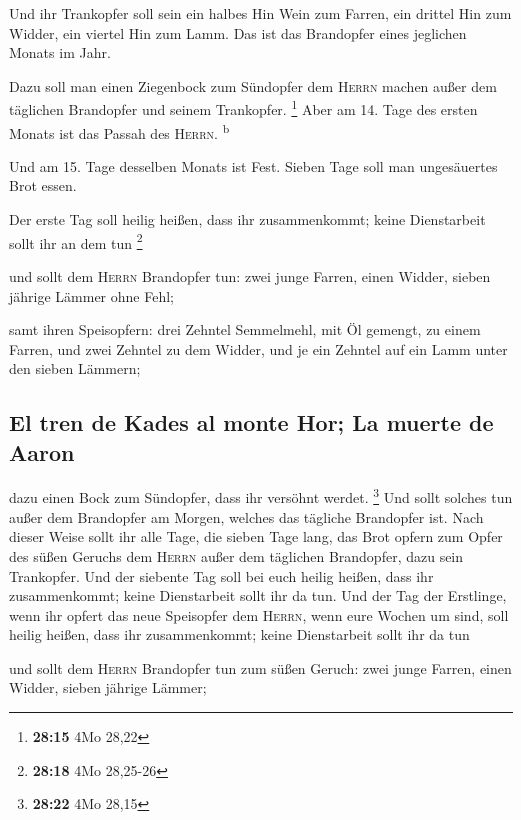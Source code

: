  Und ihr Trankopfer soll sein ein halbes Hin Wein zum
Farren, ein drittel Hin zum Widder, ein viertel Hin zum Lamm. Das ist
das Brandopfer eines jeglichen Monats im Jahr.

 Dazu soll man einen Ziegenbock zum Sündopfer dem
\textsc{Herrn} machen außer dem täglichen Brandopfer und seinem
Trankopfer. \footnote{\textbf{28:15} 4Mo 28,22}  Aber am
14. Tage des ersten Monats ist das Passah des \textsc{Herrn}.
\textsuperscript{b}

 Und am 15. Tage desselben Monats ist Fest. Sieben Tage
soll man ungesäuertes Brot essen.

 Der erste Tag soll heilig heißen, dass ihr
zusammenkommt; keine Dienstarbeit sollt ihr an dem tun \footnote{\textbf{28:18}
  4Mo 28,25-26}

 und sollt dem \textsc{Herrn} Brandopfer tun: zwei junge
Farren, einen Widder, sieben jährige Lämmer ohne Fehl;

 samt ihren Speisopfern: drei Zehntel Semmelmehl, mit Öl
gemengt, zu einem Farren, und zwei Zehntel zu dem Widder,
 und je ein Zehntel auf ein Lamm unter den sieben
Lämmern;

\hypertarget{el-tren-de-kades-al-monte-hor-la-muerte-de-aaron}{%
\subsection{El tren de Kades al monte Hor; La muerte de
Aaron}\label{el-tren-de-kades-al-monte-hor-la-muerte-de-aaron}}

 dazu einen Bock zum Sündopfer, dass ihr versöhnt werdet.
\footnote{\textbf{28:22} 4Mo 28,15}  Und sollt solches
tun außer dem Brandopfer am Morgen, welches das tägliche Brandopfer ist.
 Nach dieser Weise sollt ihr alle Tage, die sieben Tage
lang, das Brot opfern zum Opfer des süßen Geruchs dem \textsc{Herrn}
außer dem täglichen Brandopfer, dazu sein Trankopfer. 
Und der siebente Tag soll bei euch heilig heißen, dass ihr
zusammenkommt; keine Dienstarbeit sollt ihr da tun.  Und
der Tag der Erstlinge, wenn ihr opfert das neue Speisopfer dem
\textsc{Herrn}, wenn eure Wochen um sind, soll heilig heißen, dass ihr
zusammenkommt; keine Dienstarbeit sollt ihr da tun

 und sollt dem \textsc{Herrn} Brandopfer tun zum süßen
Geruch: zwei junge Farren, einen Widder, sieben jährige Lämmer;

